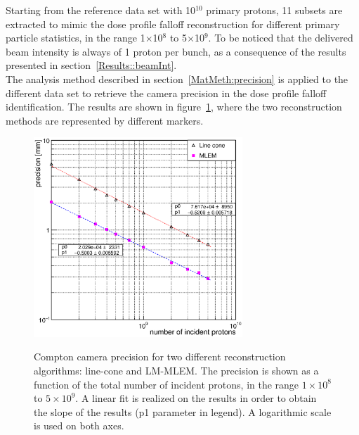 Starting from the reference data set with 10$^{10}$ primary protons, 11 subsets are extracted to mimic the dose profile falloff reconstruction for different primary particle statistics, in the range 1$\times$10$^8$ to 5$\times$10$^9$. To be noticed that the delivered beam intensity is always of 1 proton per bunch, as a consequence of the results presented in section~\ref{Results::beamInt}.\\
The analysis method described in section~\ref{MatMeth:precision} is applied to the different data set to retrieve the camera precision in the  dose profile falloff identification. The results are shown in figure~\ref{fig:precision}, where the two reconstruction methods are represented by different markers. \\

\begin{figure}[!hbtp]	
\centering
\caption{Compton camera precision for two different reconstruction algorithms: line-cone and LM-MLEM. The precision is shown as a function of the total number of incident protons, in the range $1\times10^{8}$ to $5\times10^{9}$. A linear fit is realized on the results in order to obtain the slope of the results (p1 parameter in legend). A logarithmic scale is used on both axes. }	
\includegraphics[width=0.7\textwidth]{./Figure/2017-10-21_Precision_Comparaison_linecone_MLEM_Article_Fit.eps}
\label{fig:precision}
\end{figure}

